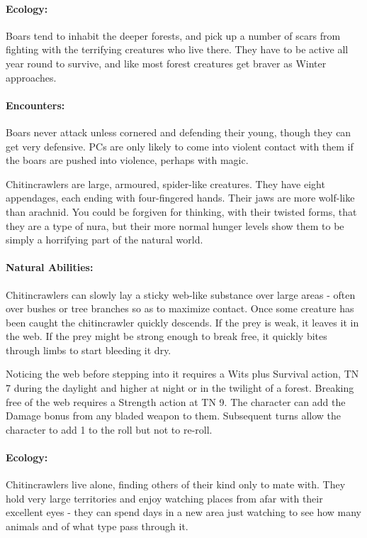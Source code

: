 \begin{multicols}{2}
\label{boar}
\boar

\paragraph{Ecology:} Boars tend to inhabit the deeper forests, and pick up a number of scars from fighting with the terrifying creatures who live there.
They have to be active all year round to survive, and like most forest creatures get braver as Winter approaches.

\paragraph{Encounters:} Boars never attack unless cornered and defending their young, though they can get very defensive.  PCs are only likely to come into violent contact with them if the boars are pushed into violence, perhaps with magic.

\label{chitincrawler}

Chitincrawlers are large, armoured, spider-like creatures.
They have eight appendages, each ending with four-fingered hands.
Their jaws are more wolf-like than arachnid.
You could be forgiven for thinking, with their twisted forms, that they are a type of nura, but their more normal hunger levels show them to be simply a horrifying part of the natural world.

\chitincrawler

\paragraph{Natural Abilities:} Chitincrawlers can slowly lay a sticky web-like substance over large areas - often over bushes or tree branches so as to maximize contact.  Once some creature has been caught the chitincrawler quickly descends.  If the prey is weak, it leaves it in the web.  If the prey might be strong enough to break free, it quickly bites through limbs to start bleeding it dry.

Noticing the web before stepping into it requires a Wits plus Survival action, TN 7 during the daylight and higher at night or in the twilight of a forest.
Breaking free of the web requires a Strength action at TN 9.
The character can add the Damage bonus from any bladed weapon to them.
Subsequent turns allow the character to add 1 to the roll but not to re-roll.

\paragraph{Ecology:} Chitincrawlers live alone, finding others of their kind only to mate with.  They hold very large territories and enjoy watching places from afar with their excellent eyes - they can spend days in a new area just watching to see how many animals and of what type pass through it.


\end{multicols}
